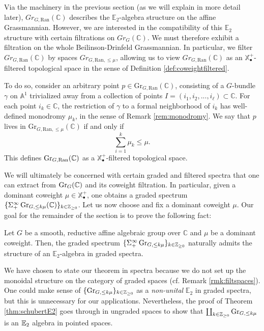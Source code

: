 Via the machinery in the previous section (as we will explain in more detail later), $Gr_{G,\text{Ran}}(\mathbb{C})$ describes the $\mathbb{E}_2$-algebra structure on the affine Grassmannian.  However, we are interested in the compatibility of this $\mathbb{E}_2$ structure with certain filtrations on $Gr_G(\mathbb{C})$.  We must therefore exhibit a filtration on the whole Beilinson-Drinfeld Grassmannian.  In particular, we filter $Gr_{G,\text{Ran}}(\mathbb{C})$ by spaces $Gr_{G,\text{Ran},\le \mu}$, allowing us to view $Gr_{G,\text{Ran}}(\mathbb{C})$ as an $\mathbb{X}_{\bullet}^+$-filtered topological space in the sense of Definition \ref{def:coweightfiltered}.  

To do so, consider an arbitrary point $p \in \text{Gr}_{G,\text{Ran}}(\mathbb{C})$, consisting of a $G$-bundle $\gamma$ on $\mathbb{A}^1$ trivialized away from a collection of points $I=(i_1,i_2,...,i_\ell) \subset \mathbb{C}$.  For each point $i_k \in \mathbb{C}$, the restriction of $\gamma$ to a formal neighborhood of $i_k$ has well-defined monodromy $\mu_k$, in the sense of Remark \ref{rem:monodromy}.  We say that $p$ lives in $\text{Gr}_{G,\text{Ran},\le \mu}(\mathbb{C})$ if and only if
$$\sum_{i=1}^{k} \mu_k \le \mu.$$  This defines $\operatorname{\mathrm{Gr}}_{G,\operatorname{\mathrm{Ran}}}(\mathbb{C})$ as a $\mathbb{X}^+_{\bullet}$-filtered topological space.

We will ultimately be concerned with certain graded and filtered spectra that one can extract from $\operatorname{\mathrm{Gr}}_{G}(\mathbb{C})$ and its coweight filtration.  In particular, given a dominant coweight $\mu \in \mathbb{X}^+_{\bullet}$, one obtains a graded spectrum $ \{ \Sigma^{\infty}_+ \operatorname{\mathrm{Gr}}_{G,\leq k\mu}(\mathbb{C})\}_{k\in \mathbb{Z}_{\geq 0}}$.  Let us now choose and fix a dominant coweight $\mu$. Our goal for the remainder of the section is to prove the following fact:

\begin{thm}\label{thm:schubertE2}
Let $G$ be a smooth, reductive affine algebraic group over $\mathbb{C}$ and $\mu$ be a dominant coweight.  Then, the graded spectrum $\{\Sigma^{\infty}_+ \operatorname{\mathrm{Gr}}_{G, \leq k \mu} \}_{k\in \mathbb{Z}_{\geq 0}}$ naturally admits the structure of an $\mathbb{E}_2$-algebra in graded spectra. 
\end{thm}

\begin{rmk}
We have chosen to state our theorem in spectra because we do not set up the monoidal structure on the category of graded spaces (cf. Remark \ref{rmk:filtspaces}).  One could make sense of $\{ \operatorname{\mathrm{Gr}}_{G,\leq k \mu} \}_{k\in \mathbb{Z}_{\geq 0}}$ as a \emph{non-unital} $\mathbb{E}_2$ in graded spectra, but this is unnecessary for our applications.  Nevertheless, the proof of Theorem \ref{thm:schubertE2} goes through in ungraded spaces to show that $\coprod_{k\in \mathbb{Z}_{\geq 0}} \operatorname{\mathrm{Gr}}_{G,\leq  k\mu}$ is an $\operatorname{\mathbb{E}}_2$ algebra in pointed spaces.  
\end{rmk}

